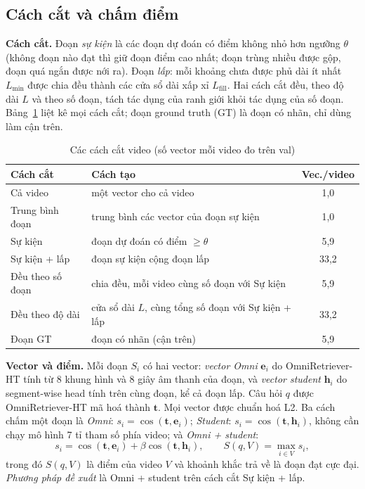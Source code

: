 \documentclass{IEEEtran}
\begin{document}
\subsection{Cách cắt và chấm điểm}
\textbf{Cách cắt.} Đoạn \emph{sự kiện} là các đoạn dự đoán có điểm không nhỏ hơn ngưỡng $\theta$ (không đoạn nào đạt thì giữ đoạn điểm cao nhất; đoạn trùng nhiều được gộp, đoạn quá ngắn được nới ra). Đoạn \emph{lấp}: mỗi khoảng chưa được phủ dài ít nhất $L_{\min}$ được chia đều thành các cửa sổ dài xấp xỉ $L_{\mathrm{fill}}$. Hai cách cắt đều, theo độ dài $L$ và theo số đoạn, tách tác dụng của ranh giới khỏi tác dụng của số đoạn. Bảng~\ref{tab:ret_cuts} liệt kê mọi cách cắt; đoạn ground truth (GT) là đoạn có nhãn, chỉ dùng làm cận trên.

\begin{table}[t]
\caption{Các cách cắt video (số vector mỗi video đo trên val)}
\label{tab:ret_cuts}
\setlength{\tabcolsep}{3pt}
\centering
\begin{tabular}{|l|p{120pt}|c|}
\hline
Cách cắt & Cách tạo & Vec./video \\
\hline
Cả video & một vector cho cả video & 1,0 \\
Trung bình đoạn & trung bình các vector của đoạn sự kiện & 1,0 \\
Sự kiện & đoạn dự đoán có điểm $\geq \theta$ & 5,9 \\
Sự kiện + lấp & đoạn sự kiện cộng đoạn lấp & 33,2 \\
Đều theo số đoạn & chia đều, mỗi video cùng số đoạn với Sự kiện & 5,9 \\
Đều theo độ dài & cửa sổ dài $L$, cùng tổng số đoạn với Sự kiện + lấp & 33,2 \\
Đoạn GT & đoạn có nhãn (cận trên) & 5,9 \\
\hline
\end{tabular}
\end{table}

\textbf{Vector và điểm.} Mỗi đoạn $S_i$ có hai vector: \emph{vector Omni} $\mathbf{e}_i$ do OmniRetriever-HT tính từ 8 khung hình và 8 giây âm thanh của đoạn, và \emph{vector student} $\mathbf{h}_i$ do segment-wise head tính trên cùng đoạn, kể cả đoạn lấp. Câu hỏi $q$ được OmniRetriever-HT mã hoá thành $\mathbf{t}$. Mọi vector được chuẩn hoá L2. Ba cách chấm một đoạn là \emph{Omni}: $s_i = \cos(\mathbf{t}, \mathbf{e}_i)$; \emph{Student}: $s_i = \cos(\mathbf{t}, \mathbf{h}_i)$, không cần chạy mô hình 7 tỉ tham số phía video; và \emph{Omni + student}:
\begin{equation}
\label{eq:ret_score}
s_i = \cos(\mathbf{t}, \mathbf{e}_i) + \beta \cos(\mathbf{t}, \mathbf{h}_i), \qquad S(q, V) = \max_{i \in V} s_i ,
\end{equation}
trong đó $S(q, V)$ là điểm của video $V$ và khoảnh khắc trả về là đoạn đạt cực đại. \emph{Phương pháp đề xuất} là Omni + student trên cách cắt Sự kiện + lấp.
\end{document}
